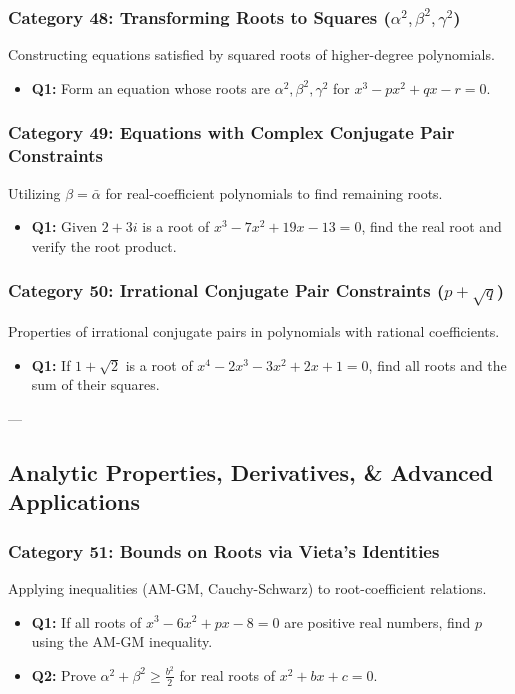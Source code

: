 \documentclass[10pt,a4paper]{article}
\begin{document}
\subsubsection{Category 48: Transforming Roots to Squares ($\alpha^2, \beta^2, \gamma^2$)}
Constructing equations satisfied by squared roots of higher-degree polynomials.
\begin{itemize}[leftmargin=*]
    \item \textbf{Q1:} Form an equation whose roots are $\alpha^2, \beta^2, \gamma^2$ for $x^3 - px^2 + qx - r = 0$.
\end{itemize}

\subsubsection{Category 49: Equations with Complex Conjugate Pair Constraints}
Utilizing $\beta = \bar{\alpha}$ for real-coefficient polynomials to find remaining roots.
\begin{itemize}[leftmargin=*]
    \item \textbf{Q1:} Given $2 + 3i$ is a root of $x^3 - 7x^2 + 19x - 13 = 0$, find the real root and verify the root product.
\end{itemize}

\subsubsection{Category 50: Irrational Conjugate Pair Constraints ($p + \sqrt{q}$)}
Properties of irrational conjugate pairs in polynomials with rational coefficients.
\begin{itemize}[leftmargin=*]
    \item \textbf{Q1:} If $1 + \sqrt{2}$ is a root of $x^4 - 2x^3 - 3x^2 + 2x + 1 = 0$, find all roots and the sum of their squares.
\end{itemize}

---

\subsection{Analytic Properties, Derivatives, \& Advanced Applications}

\subsubsection{Category 51: Bounds on Roots via Vieta's Identities}
Applying inequalities (AM-GM, Cauchy-Schwarz) to root-coefficient relations.
\begin{itemize}[leftmargin=*]
    \item \textbf{Q1:} If all roots of $x^3 - 6x^2 + px - 8 = 0$ are positive real numbers, find $p$ using the AM-GM inequality.
    \item \textbf{Q2:} Prove $\alpha^2 + \beta^2 \ge \frac{b^2}{2}$ for real roots of $x^2 + bx + c = 0$.
\end{itemize}
\end{document}
